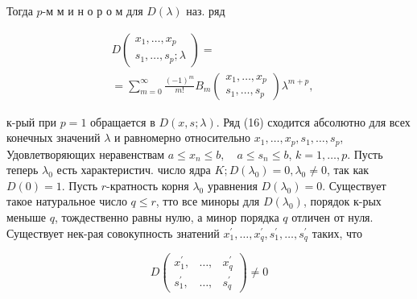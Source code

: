 \documentclass[10pt]{article}
\begin{document}
Тогда $p$-м м и н о р о м для $D(\lambda)$ наз. ряд



\[

\begin{aligned}

& D\left(\begin{array}{c}

x_{1}, \ldots, x_{p} \\

s_{1}, \ldots, s_{p} ; \lambda

\end{array}\right)= \\

& =\sum_{m=0}^{\infty} \frac{(-1)^{m}}{m !} B_{m}\left(\begin{array}{c}

x_{1}, \ldots, x_{p} \\

s_{1}, \ldots, s_{p}

\end{array}\right) \lambda^{m+p} \text {, }

\end{aligned}

\]



к-рый при $p=1$ обращается в $D(x, s ; \lambda)$. Ряд (16) сходится абсолютно для всех конечных значений $\lambda$ и равномерно относительно $x_{1}, \ldots, x_{p}, s_{1}, \ldots, s_{p}$, Удовлетворяющих неравенствам $a \leqslant x_{n} \leqslant b, \quad a \leqslant s_{n} \leqslant b$, $k=1, \ldots, p$. Пусть теперь $\lambda_{0}$ есть характеристич. число ядра $K ; D\left(\lambda_{0}\right)=0, \lambda_{0} \neq 0$, так как $D(0)=1$. Пусть $r$-кратность корня $\lambda_{0}$ уравнения $D\left(\lambda_{0}\right)=0$. Существует такое натуральное число $q \leqslant r$, тто все миноры для $D\left(\lambda_{0}\right)$, порядок к-рых меныше $q$, тождественно равны нулю, а минор порядка $q$ отличен от нуля. Существует нек-рая совокупность знатений $x_{1}^{\prime}, \ldots, x_{q}^{\prime}, s_{1}^{\prime}, \ldots, s_{q}^{\prime}$ таких, что



\[

D\left(\begin{array}{lll}

x_{1}^{\prime}, & \ldots, & x_{q}^{\prime} \\

s_{1}^{\prime}, & \ldots, & s_{q}^{\prime}

\end{array}\right) \neq 0

\]
\end{document}
